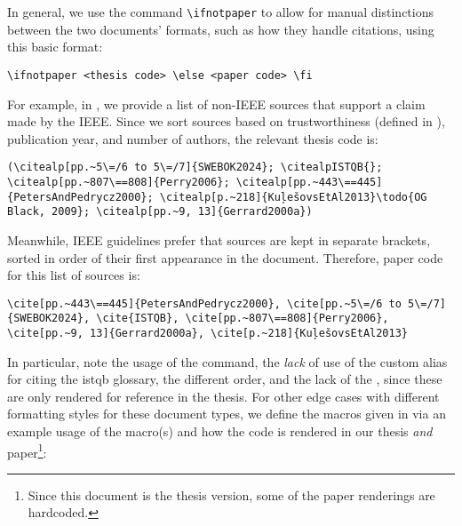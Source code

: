 In general, we use the command
\texttt{\textbackslash ifnotpaper} to allow for manual distinctions between the
two documents' formats, such as how they handle citations, using this basic format:
\begin{displayquote}
    \texttt{\textbackslash ifnotpaper <thesis code> \textbackslash else <paper code> \textbackslash fi}
\end{displayquote}
For example, in , we provide a list of non-IEEE sources
that support a claim made by the IEEE. Since we sort sources based on
trustworthiness (defined in ), publication year, and number of
authors, the relevant thesis code is:
\begin{displayquote}
    \texttt{(\textbackslash citealp[pp.\textasciitilde 5\textbackslash =/6 to 5\textbackslash =/7]\{SWEBOK2024\};
        \displayNL \textbackslash citealpISTQB\{\};
        \textbackslash citealp[pp.\textasciitilde 807\textbackslash ==808]\{Perry2006\};
        \displayNL \textbackslash citealp[pp.\textasciitilde 443\textbackslash ==445]\{PetersAndPedrycz2000\};
        \displayNL \textbackslash citealp[p.\textasciitilde 218]\{KuļešovsEtAl2013\}\textbackslash todo\{OG Black, 2009\};
        \displayNL \textbackslash citealp[pp.\textasciitilde 9, 13]\{Gerrard2000a\})}
\end{displayquote}
Meanwhile, IEEE guidelines prefer that sources are kept in separate brackets,
sorted in order of their first appearance in the document. Therefore, paper
code for this list of sources is:
\begin{displayquote}
    \texttt{\textbackslash cite[pp.\textasciitilde 443\textbackslash ==445]\{PetersAndPedrycz2000\},
        \displayNL \textbackslash cite[pp.\textasciitilde 5\textbackslash =/6 to 5\textbackslash =/7]\{SWEBOK2024\},
        \textbackslash cite\{ISTQB\},
        \displayNL \textbackslash cite[pp.\textasciitilde 807\textbackslash ==808]\{Perry2006\},
        \displayNL \textbackslash cite[pp.\textasciitilde 9, 13]\{Gerrard2000a\},
        \displayNL \textbackslash cite[p.\textasciitilde 218]\{KuļešovsEtAl2013\}}
\end{displayquote}\utd{}
In particular, note the usage of the  command, the \emph{lack} of
use of the custom alias for citing the \acs{istqb} glossary, the different
order, and the lack of the , since these are only rendered for
reference in the thesis. For other edge cases with different formatting styles
for these document types, we define the macros given in 
via an example usage of the macro(s) and how the code is rendered in our thesis
\emph{and} paper\footnote{Since this document is the thesis version, some of
    the paper renderings are hardcoded.}:


